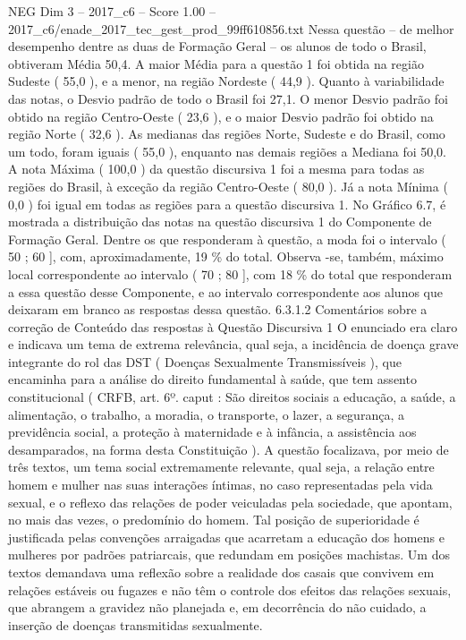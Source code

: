 \begin{textsample}{NEG Dim 3 – 2017\_c6 – Score 1.00 – 2017\_c6/enade\_2017\_tec\_gest\_prod\_99ff610856.txt}
Nessa questão – de melhor desempenho dentre as duas de Formação Geral – os alunos de todo o Brasil, obtiveram Média 50,4.
A maior Média para a questão 1 foi obtida na região Sudeste ( 55,0 ), e a menor, na região Nordeste ( 44,9 ).
Quanto à variabilidade das notas, o Desvio padrão de todo o Brasil foi 27,1.
O menor Desvio padrão foi obtido na região Centro-Oeste ( 23,6 ), e o maior Desvio padrão foi obtido na região Norte ( 32,6 ).
As medianas das regiões Norte, Sudeste e do Brasil, como um todo, foram iguais ( 55,0 ), enquanto nas demais regiões a Mediana foi 50,0.
A nota Máxima ( 100,0 ) da questão discursiva 1 foi a mesma para todas as regiões do Brasil, à exceção da região Centro-Oeste ( 80,0 ).
Já a nota Mínima ( 0,0 ) foi igual em todas as regiões para a questão discursiva 1.
No Gráfico 6.7, é mostrada a distribuição das notas na questão discursiva 1 do Componente de Formação Geral.
Dentre os que responderam à questão, a moda foi o intervalo ( 50 ; 60 ], com, aproximadamente, 19 \% do total.
Observa -se, também, máximo local correspondente ao intervalo ( 70 ; 80 ], com 18 \% do total que responderam a essa questão desse Componente, e ao intervalo correspondente aos alunos que deixaram em branco as respostas dessa questão. 6.3.1.2 Comentários sobre a correção de Conteúdo das respostas à Questão Discursiva 1 O enunciado era claro e indicava um tema de extrema relevância, qual seja, a incidência de doença grave integrante do rol das DST ( Doenças Sexualmente Transmissíveis ), que encaminha para a análise do direito fundamental à saúde, que tem assento constitucional ( CRFB, art. 6º. caput : São direitos sociais a educação, a saúde, a alimentação, o trabalho, a moradia, o transporte, o lazer, a segurança, a previdência social, a proteção à maternidade e à infância, a assistência aos desamparados, na forma desta Constituição ).
A questão focalizava, por meio de três textos, um tema social extremamente relevante, qual seja, a relação entre homem e mulher nas suas interações íntimas, no caso representadas pela vida sexual, e o reflexo das relações de poder veiculadas pela sociedade, que apontam, no mais das vezes, o predomínio do homem.
Tal posição de superioridade é justificada pelas convenções arraigadas que acarretam a educação dos homens e mulheres por padrões patriarcais, que redundam em posições machistas.
Um dos textos demandava uma reflexão sobre a realidade dos casais que convivem em relações estáveis ou fugazes e não têm o controle dos efeitos das relações sexuais, que abrangem a gravidez não planejada e, em decorrência do não cuidado, a inserção de doenças transmitidas sexualmente.

\end{textsample}
